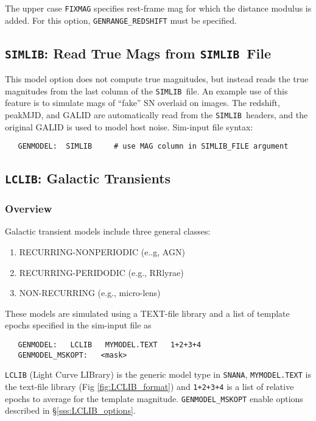 \documentclass[12pt]{article}
\newcommand{\LCLIB}{{\tt LCLIB}}
\newcommand{\snana}{{\tt SNANA}}
\newcommand{\simlib}{{\tt SIMLIB}}
\begin{document}
The upper case {\tt FIXMAG} specifies rest-frame mag for which
the distance modulus is added. 
For this option, {\tt GENRANGE\_REDSHIFT} must be specified.


\subsection{{\simlib}: Read True Mags from \simlib\ File}
\label{subsec:MODEL_SIMLIB}

This model option does not compute true magnitudes, but instead
reads the true magnitudes from the last column of the \simlib\ file.
An example use of this feature is to simulate mags of
``fake'' SN overlaid on images. The redshift, peakMJD, and GALID
are automatically read from the \simlib\ headers, and the
original GALID is used to model host noise.
Sim-input file syntax:
\begin{verbatim}
   GENMODEL:  SIMLIB     # use MAG column in SIMLIB_FILE argument
\end{verbatim}


\subsection{{\LCLIB}: Galactic Transients}
\label{subsec:MODEL_LCLIB}

\subsubsection{Overview}
\label{sss:LCLIB_overview}

\noindent Galactic transient models include three general classes:
\begin{enumerate}
  \item RECURRING-NONPERIODIC (e..g, AGN)
  \item RECURRING-PERIDODIC  (e.g., RRlyrae)
  \item NON-RECURRING  (e.g., micro-lens)
\end{enumerate}
%
\noindent
These models are simulated using a TEXT-file library and a list of 
template epochs specified in the sim-input file as
%
\begin{verbatim}
   GENMODEL:   LCLIB   MYMODEL.TEXT   1+2+3+4
   GENMODEL_MSKOPT:   <mask>
\end{verbatim}
{\tt LCLIB} (Light Curve LIBrary) is the generic model type in \snana,
{\tt MYMODEL.TEXT} is the text-file library (Fig \ref{fig:LCLIB_format})
and {\tt 1+2+3+4} is a list of relative epochs to average for the template magnitude.
{\tt GENMODEL\_MSKOPT} enable options described in \S\ref{sss:LCLIB_options}.
\end{document}
